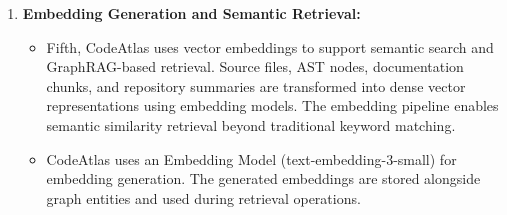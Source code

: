 \documentclass[conference]{IEEEtran}
\begin{document}
\begin{enumerate}
    \begin{itemize}
        \item [-] Fourth, the system stores repository entities and relationships in Neo4j. Neo4j is suitable because repository comprehension is relationship-centered. CodeAtlas uses uniqueness constraints and indexes on stable identifiers to reduce duplicate nodes and improve query performance. Typical queries include repository overview, node details, bounded neighborhoods, path discovery, graph search, and GraphRAG context retrieval. The graph schema is designed to preserve both repository hierarchy and semantic relationships.\\
        \item \textbf{Graph Relationship} such as:
        \begin{itemize}
            \item CONTAINS
            \item IMPORTS
            \item REFERENCES
            \item EXTENDS
            \item DECLARES
            \item HAS\_AST\_ROOT
            \item HAS\_CHUNK
            \item DESCRIBES\\
        \end{itemize}
    \end{itemize}

    \item \textbf{Embedding Generation and Semantic Retrieval:}\\

    \begin{itemize}
        \item [-] Fifth, CodeAtlas uses vector embeddings to support semantic search and GraphRAG-based retrieval. Source files, AST nodes, documentation chunks, and repository summaries are transformed into dense vector representations using embedding models. The embedding pipeline enables semantic similarity retrieval beyond traditional keyword matching.\\

        \item [-] CodeAtlas uses an Embedding Model (text-embedding-3-small) for embedding generation. The generated embeddings are stored alongside graph entities and used during retrieval operations.\\


\end{itemize}
\end{enumerate}
\end{document}
